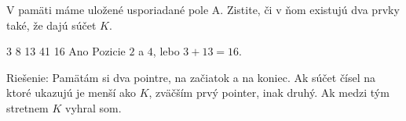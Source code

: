 
V pamäti máme uložené usporiadané pole A. Zistite, či
v ňom existujú dva prvky také, že dajú súčet $K$.

 3 8 13 41
16
\vystup
Ano
\komentar
Pozicie $2$ a $4$, lebo $3+13=16$.
\koniec

Riešenie: Pamätám si dva pointre, na začiatok a na koniec.
Ak súčet čísel na ktoré ukazujú je menší ako $K$, zväčším prvý
pointer, inak druhý. Ak medzi tým stretnem $K$ vyhral som.
